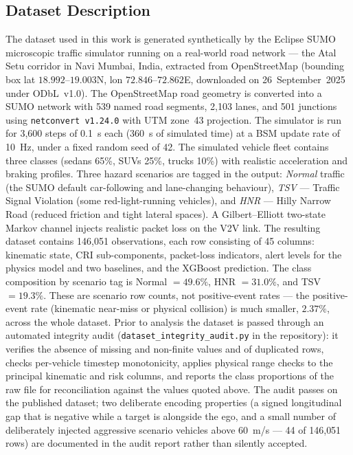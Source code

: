 \documentclass[sn-mathphys-num,Numbered,iicol]{sn-jnl}
\begin{document}
\subsection{Dataset Description}\label{sec:dataset}
The dataset used in this work is generated synthetically by the Eclipse SUMO microscopic traffic simulator running on a real-world road network --- the Atal Setu corridor in Navi Mumbai, India, extracted from OpenStreetMap (bounding box lat $18.992$--$19.003$\textdegree{}N, lon $72.846$--$72.862$\textdegree{}E, downloaded on 26~September~2025 under ODbL~v1.0). The OpenStreetMap road geometry is converted into a SUMO network with 539 named road segments, 2{,}103 lanes, and 501 junctions using \texttt{netconvert v1.24.0} with UTM zone~43 projection. The simulator is run for 3{,}600 steps of 0.1~s each (360~s of simulated time) at a BSM update rate of 10~Hz, under a fixed random seed of 42. The simulated vehicle fleet contains three classes (sedans 65\%, SUVs 25\%, trucks 10\%) with realistic acceleration and braking profiles. Three hazard scenarios are tagged in the output: \emph{Normal} traffic (the SUMO default car-following and lane-changing behaviour), \emph{TSV} --- Traffic Signal Violation (some red-light-running vehicles), and \emph{HNR} --- Hilly Narrow Road (reduced friction and tight lateral spaces). A Gilbert--Elliott two-state Markov channel injects realistic packet loss on the V2V link. The resulting dataset contains 146{,}051 observations, each row consisting of 45 columns: kinematic state, CRI sub-components, packet-loss indicators, alert levels for the physics model and two baselines, and the XGBoost prediction. The class composition by scenario tag is Normal $= 49.6\%$, HNR $= 31.0\%$, and TSV $= 19.3\%$. These are scenario row counts, not positive-event rates --- the positive-event rate (kinematic near-miss or physical collision) is much smaller, $2.37\%$, across the whole dataset. Prior to analysis the dataset is passed through an automated integrity audit (\texttt{dataset\_integrity\_audit.py} in the repository): it verifies the absence of missing and non-finite values and of duplicated rows, checks per-vehicle timestep monotonicity, applies physical range checks to the principal kinematic and risk columns, and reports the class proportions of the raw file for reconciliation against the values quoted above. The audit passes on the published dataset; two deliberate encoding properties (a signed longitudinal gap that is negative while a target is alongside the ego, and a small number of deliberately injected aggressive scenario vehicles above 60~m/s --- 44 of 146{,}051 rows) are documented in the audit report rather than silently accepted.
\end{document}
